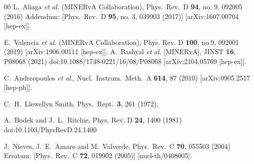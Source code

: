\documentclass[aps,prl,twocolumn,superscriptaddress,nofootinbib]{revtex4}
\begin{document}
\begin{thebibliography}{00}
  L.~Aliaga {\it et al.} (MINERvA Collaboration),
  Phys.\ Rev.\ D {\bf 94}, no. 9, 092005 (2016)
  Addendum: [Phys.\ Rev.\ D {\bf 95}, no. 3, 039903 (2017)]
  [arXiv:1607.00704 [hep-ex]].

E.~Valencia \textit{et al.} (MINERvA Collaboration),
Phys. Rev. D \textbf{100}, no.9, 092001 (2019)
[arXiv:1906.00111 [hep-ex]].
A.~Bashyal \textit{et al.} [MINERvA],
JINST \textbf{16}, P08068 (2021)
doi:10.1088/1748-0221/16/08/P08068
[arXiv:2104.05769 [hep-ex]].

  C.~Andreopoulos {\it et al.},
  Nucl.\ Instrum.\ Meth.\ A {\bf 614}, 87 (2010)
  [arXiv:0905.2517 [hep-ph]].
  
  
  
  C.~H.~Llewellyn Smith, 
  Phys.\ Rept.\ {\bf 3}, 261 (1972). 

A.~Bodek and J.~L.~Ritchie,
Phys. Rev. D \textbf{24}, 1400 (1981)
doi:10.1103/PhysRevD.24.1400

  J.~Nieves, J.~E.~Amaro and M.~Valverde,
  Phys.\ Rev.\ C {\bf 70}, 055503 (2004)
  Erratum: [Phys.\ Rev.\ C {\bf 72}, 019902 (2005)]
  [nucl-th/0408005].



\end{thebibliography}
\end{document}
